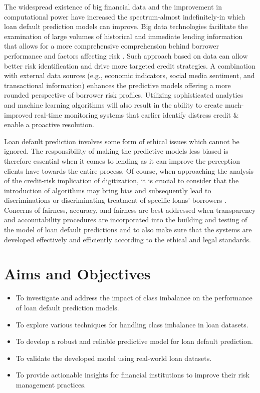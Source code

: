 \documentclass[12pt, a4paper,oneside]{book}
\numberwithin{equation}{section}
\begin{document}
The widespread existence of big financial data and the improvement in computational power have increased the spectrum-almost indefinitely-in which loan default prediction models can improve. Big data technologies facilitate the examination of large volumes of historical and immediate lending information that allows for a more comprehensive comprehension behind borrower performance and factors affecting risk \cite{fan}. Such approach based on data can allow better risk identification and drive more targeted credit strategies. A combination with external data sources (e.g., economic indicators, social media sentiment, and transactional information) enhances the predictive models offering a more rounded perspective of borrower risk profiles. Utilizing sophisticated analytics and machine learning algorithms will also result in the ability to create much-improved real-time monitoring systems that earlier identify distress credit \& enable a proactive resolution.

Loan default prediction involves some form of ethical issues which cannot be ignored. The responsibility of making the predictive models less biased is therefore essential when it comes to lending as it can improve the perception clients have towards the entire process. Of course, when approaching the analysis of the credit-risk implication of digitization, it is crucial to consider that the introduction of algorithms may bring bias and subsequently lead to discriminations or discriminating treatment of specific loans’ borrowers \cite{barocas2023fairness}. Concerns of fairness, accuracy, and fairness are best addressed when transparency and accountability procedures are incorporated into the building and testing of the model of loan default predictions and to also make sure that the systems are developed effectively and efficiently according to the ethical and legal standards. 


\section{Aims and Objectives}
\begin{itemize}
    \item To investigate and address the impact of class imbalance on the performance of loan default prediction models.

    \item To explore various techniques for handling class imbalance in loan datasets.

    \item To develop a robust and reliable predictive model for loan default prediction.

    \item To validate the developed model using real-world loan datasets.

    \item To provide actionable insights for financial institutions to improve their risk management practices.
\end{itemize}
\end{document}
